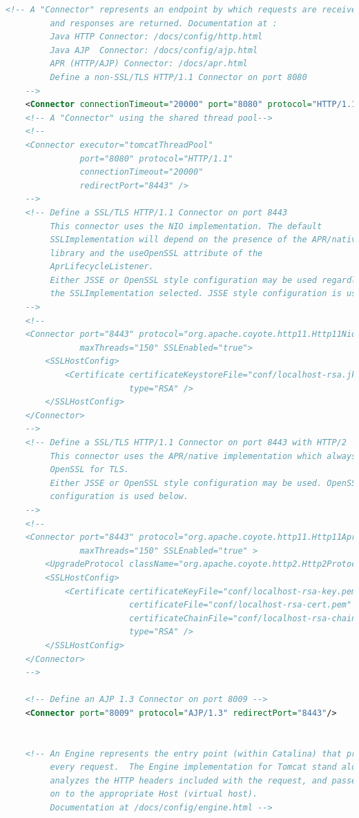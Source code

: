 \documentclass[a4paper,oneside, 11pt]{article}
\begin{document}
\begin{enumerate}
\begin{lstlisting}[language=XML]
    <!-- A "Connector" represents an endpoint by which requests are received
         and responses are returned. Documentation at :
         Java HTTP Connector: /docs/config/http.html
         Java AJP  Connector: /docs/config/ajp.html
         APR (HTTP/AJP) Connector: /docs/apr.html
         Define a non-SSL/TLS HTTP/1.1 Connector on port 8080
    -->
    <Connector connectionTimeout="20000" port="8080" protocol="HTTP/1.1" redirectPort="8443"/>
    <!-- A "Connector" using the shared thread pool-->
    <!--
    <Connector executor="tomcatThreadPool"
               port="8080" protocol="HTTP/1.1"
               connectionTimeout="20000"
               redirectPort="8443" />
    -->
    <!-- Define a SSL/TLS HTTP/1.1 Connector on port 8443
         This connector uses the NIO implementation. The default
         SSLImplementation will depend on the presence of the APR/native
         library and the useOpenSSL attribute of the
         AprLifecycleListener.
         Either JSSE or OpenSSL style configuration may be used regardless of
         the SSLImplementation selected. JSSE style configuration is used below.
    -->
    <!--
    <Connector port="8443" protocol="org.apache.coyote.http11.Http11NioProtocol"
               maxThreads="150" SSLEnabled="true">
        <SSLHostConfig>
            <Certificate certificateKeystoreFile="conf/localhost-rsa.jks"
                         type="RSA" />
        </SSLHostConfig>
    </Connector>
    -->
    <!-- Define a SSL/TLS HTTP/1.1 Connector on port 8443 with HTTP/2
         This connector uses the APR/native implementation which always uses
         OpenSSL for TLS.
         Either JSSE or OpenSSL style configuration may be used. OpenSSL style
         configuration is used below.
    -->
    <!--
    <Connector port="8443" protocol="org.apache.coyote.http11.Http11AprProtocol"
               maxThreads="150" SSLEnabled="true" >
        <UpgradeProtocol className="org.apache.coyote.http2.Http2Protocol" />
        <SSLHostConfig>
            <Certificate certificateKeyFile="conf/localhost-rsa-key.pem"
                         certificateFile="conf/localhost-rsa-cert.pem"
                         certificateChainFile="conf/localhost-rsa-chain.pem"
                         type="RSA" />
        </SSLHostConfig>
    </Connector>
    -->

    <!-- Define an AJP 1.3 Connector on port 8009 -->
    <Connector port="8009" protocol="AJP/1.3" redirectPort="8443"/>


    <!-- An Engine represents the entry point (within Catalina) that processes
         every request.  The Engine implementation for Tomcat stand alone
         analyzes the HTTP headers included with the request, and passes them
         on to the appropriate Host (virtual host).
         Documentation at /docs/config/engine.html -->


\end{lstlisting}
\end{enumerate}
\end{document}
